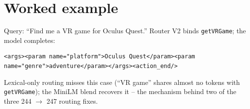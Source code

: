 \documentclass[11pt]{article}
\newcommand{\code}[1]{\texttt{#1}}
\begin{document}
\section{Worked example}
\label{app:example}

Query: ``Find me a VR game for Oculus Quest.'' Router V2 binds
\code{getVRGame}; the model completes:
\begin{lstlisting}
<args><param name="platform">Oculus Quest</param><param name="genre">adventure</param></args><action_end/>
\end{lstlisting}
Lexical-only routing misses this case (``VR game'' shares almost no
tokens with \code{getVRGame}); the MiniLM blend recovers it -- the
mechanism behind two of the three 244 $\to$ 247 routing fixes.
\end{document}

